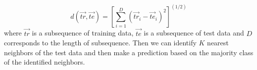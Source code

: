 \[
d( \vec{tr}, \vec{te} ) = [ \sum_{i=1}^{D} (\vec{tr}_i - \vec{te}_i)^2  ]^{(1/2)}
\]
where $\vec{tr}$ is a subsequence of training data, $\vec{te}$ is a subsequence of test data and $D$ corresponds to the length of subsequence. 
Then we can identify $K$ nearest neighbors of the test data and then make a prediction based on the majority class of the identified neighbors. 






\begin{comment}
There exist a few other machine learning methods such as \term{Support Vector Machine} or \term{Perceptron}, they have couple of drawbacks when applied to our pattern matching problem: 

(1) Features are not fixed 

Consider a sequence of CPU usage values as a vector and then KNN tries to find out k nearest vectors 
\end{comment}